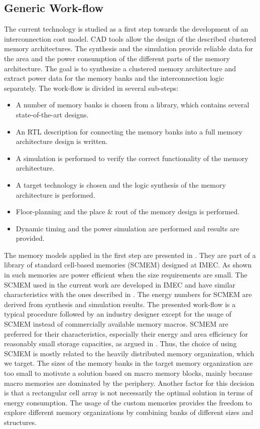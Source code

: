 \subsection{Generic Work-flow}

The current technology is studied as a first step towards the development of an interconnection cost model. 
CAD tools allow the design of the described clustered memory architectures.
The synthesis and the simulation provide reliable data for the area and the power consumption of the different parts of the memory architecture.
The goal is to synthesize a clustered memory architecture and extract power data for the memory banks and the interconnection logic separately.
The work-flow is divided in several sub-steps:

\begin{itemize}
	\item A number of memory banks is chosen from a library, which contains several state-of-the-art designs.
	\item An RTL description for connecting the memory banks into a full memory architecture design is written.
	\item A simulation is performed to verify the correct functionality of the memory architecture.
	\item A target technology is chosen and the logic synthesis of the memory architecture is performed.
	\item Floor-planning and the place \& rout of the memory design is performed.
	\item Dynamic timing and the power simulation are performed and results are provided.
\end{itemize}

The memory models applied in the first step are presented in \cite{filippopoulos2013exploration}.
They are part of a library of standard cell-based memories (SCMEM) designed at IMEC. As shown in \cite{Mei11} such memories are power efficient when the size requirements are small.
The SCMEM used in the current work are developed in IMEC and have similar characteristics with the ones described in \cite{Mei11}.
The energy numbers for SCMEM are derived from synthesis and simulation results.
The presented work-flow is a typical procedure followed by an industry designer except for the usage of SCMEM instead of commercially available memory macros.
SCMEM are preferred for their characteristics,  especially their energy and area efficiency for reasonably small storage capacities, as argued in \cite{Mei10}. 
Thus, the choice of using SCMEM is mostly related to the heavily distributed memory organization, which we target. 
The sizes of the memory banks in the target memory organization are too small to motivate a solution based on macro memory blocks, mainly because macro memories are dominated by the periphery.
Another factor for this decision is that a rectangular cell array is not necessarily the optimal solution in terms of energy consumption.
The usage of the custom memories provides the freedom to explore different memory organizations by combining banks of different sizes and structures.  

